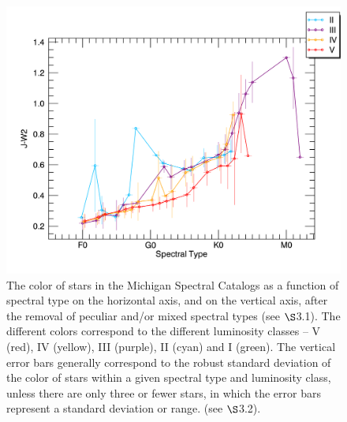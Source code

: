 \begin{figure}[t]
\centering
\includegraphics[width=1.0\textwidth,clip=true]{Figures/subtype_bar/SPT_J-W2.png}
\caption{The color of stars in the Michigan Spectral Catalogs as a function of spectral type on the horizontal axis, and \jwtwo on the vertical axis, after the removal of peculiar and/or mixed spectral types (see ${\S}$3.1). The different colors correspond to the different luminosity classes -- V (red), IV (yellow), III (purple), II (cyan) and I (green).  The vertical error bars generally correspond to the robust standard deviation of the \jwtwo color of stars within a given spectral type and luminosity class, unless there are only three or fewer stars, in which the error bars represent a standard deviation or range. (see ${\S}$3.2).}
\end{figure}
